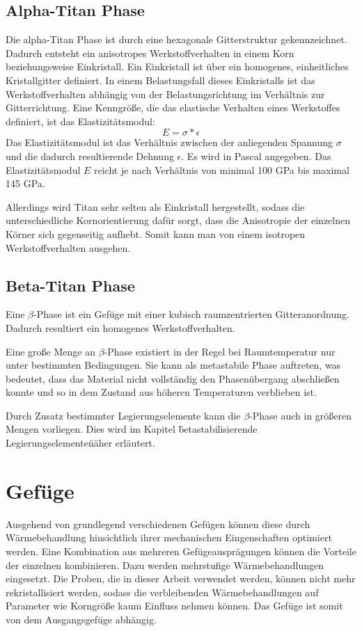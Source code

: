 \documentclass[a4paper, 11pt]{tubsreprt}
\begin{document}
\subsection{Alpha-Titan Phase}
Die alpha-Titan Phase ist durch eine hexagonale Gitterstruktur gekennzeichnet. Dadurch entsteht ein anisotropes Werkstoffverhalten in einem Korn beziehungsweise Einkristall.
Ein Einkristall ist über ein homogenes, einheitliches Kristallgitter definiert.
In einem Belastungsfall dieses Einkristalls ist das Werkstoffverhalten abhängig von der Belastungsrichtung im Verhältnis zur Gitterrichtung. Eine Kenngröße, die das elastische Verhalten eines Werkstoffes definiert, ist das Elastizitätsmodul: 
\begin{equation}
E=\sigma*\epsilon
\end{equation}
Das Elastizitätsmodul ist das Verhältnis zwischen der anliegenden Spannung $\sigma$ und die dadurch resultierende Dehnung $\epsilon$.
Es wird in Pascal angegeben. Das Elastizitätsmodul $E$ reicht je nach Verhältnis von minimal 100 GPa bis maximal 145 GPa. 

Allerdings wird Titan sehr selten als Einkristall hergestellt, sodass die unterschiedliche Kornorientierung dafür sorgt, dass die Anisotropie der einzelnen Körner sich gegenseitig aufhebt. Somit kann man von einem isotropen Werkstoffverhalten ausgehen.


\subsection{Beta-Titan Phase}
Eine $\beta$-Phase ist ein Gefüge mit einer kubisch raumzentrierten Gitteranordnung. Dadurch resultiert ein homogenes Werkstoffverhalten.

Eine große Menge an $\beta$-Phase existiert in der Regel bei Raumtemperatur nur unter bestimmten Bedingungen. Sie kann als metastabile Phase auftreten, was bedeutet, dass das Material nicht vollständig den Phasenübergang abschließen konnte und so in dem Zustand aus höheren Temperaturen verblieben ist.  

Durch Zusatz bestimmter Legierungselemente kann die $\beta$-Phase auch in größeren Mengen vorliegen. Dies wird im Kapitel \"betastabilisierende Legierungselemente\" näher erläutert.
\section{Gefüge}



Ausgehend von grundlegend verschiedenen Gefügen können diese durch Wärmebehandlung hinsichtlich ihrer mechanischen Eingenschaften optimiert werden. Eine Kombination aus mehreren Gefügeausprägungen können die Vorteile der einzelnen kombinieren. Dazu werden mehrstufige Wärmebehandlungen eingesetzt. Die Proben, die in dieser Arbeit verwendet werden, können nicht mehr rekristallisiert werden, sodass die verbleibenden Wärmebehandlungen auf Parameter wie Korngröße kaum Einfluss nehmen können. Das Gefüge ist somit von dem Ausgangsgefüge abhängig.  
\end{document}
